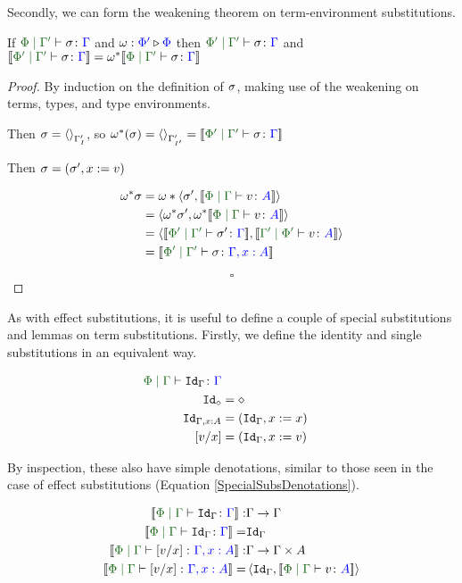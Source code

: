 \documentclass{Report}
\begin{document}
Secondly, we can form the weakening theorem on term-environment substitutions.


\begin{theorem}
    If $\etyperelation{\P}{\G'}{\si}{\G}$ and $\omega : {\color{blue}\Phi'} \triangleright {\color {blue} \Phi}$ then $\etyperelation{\P'}{\G'}{\si}{\G}$ and $\deno{\etyperelation{\P'}{\G'}{\si}{\G}} = \w\star\deno{\etyperelation{\P}{\G'}{\si}{\G}}$
\end{theorem}

\begin{proof}
    By induction on the definition of $\sigma$, making use of the weakening on terms, types, and type environments.

    Then $\sigma = \left\langle\right\rangle_{\Gamma'_{I}}$, so $\w\star(\si) = \term{\G'_{I'}} = \deno{\etyperelation{\P'}{\G'}{\si}{\G}}$
    
    Then $\sigma = (\sigma',x:= v)$
    
    \begin{align*}
        \w\star\si & = \w*\pr{\si'}{\deno{\gpetyperelation{v}{A}}}\\
        & = \pr{\w\star\si'}{\w\star\deno{\gpetyperelation{v}{A}}}\\
        &=\pr{\deno{\etyperelation{\P'}{\G'}{\si'}{\G}}}{\deno{\etyperelation{\G'}{\P'}{v}{A}}}\\
        &=\deno{\etyperelation{\P'}{\G'}{\si}{\gax}}
    \end{align*}

    $$\square$$

\end{proof}

As with effect substitutions, it is useful to define a couple of special substitutions and lemmas on term substitutions. Firstly, we define the identity and single substitutions in an equivalent way.

\begin{align*}
    \etyperelation{\P}{\G}{\Id{\G}}{\G}\\
    \Id{\nil} & = \nil\\
    \Id{\gax} & = (\idg, x\setto x)\\
    \ssub{x}{v} & = (\idg, x\setto v)\\
\end{align*}

By inspection, these also have simple denotations, similar to those seen in the case of effect substitutions (Equation \ref{SpecialSubsDenotations}).

\begin{align*}
    \deno{\etyperelation{\P}{\G}{\Id{\G}}{\G}}: & \G\rightarrow\G\\
    \deno{\etyperelation{\P}{\G}{\Id{\G}}{\G}} = &  \idg\\
    \deno{\etyperelation{\P}{\G}{\ssub{x}{v}}{\gax}}: & \G\rightarrow \G\times A\\
    \deno{\etyperelation{\P}{\G}{\ssub{x}{v}}{\gax}} = & \pr{\idg}{\deno{\gpetyperelation{v}{A}}}
\end{align*}
\end{document}
